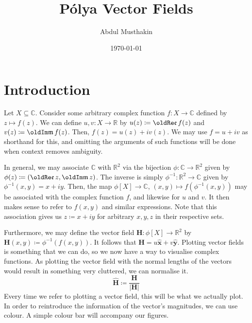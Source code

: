 \documentclass[a4paper]{article}
\title{P\'olya Vector Fields}
\author{Abdul Musthakin}
\date{\today}
\newcommand{\R}{\mathbb{R}}
\newcommand{\C}{\mathbb{C}}
\renewcommand{\Im}{\mathop{\oldIm\mathfrak{m}}}
\renewcommand{\Re}{\mathop{\oldRe\mathfrak{e}}}
\theoremstyle{definition}
\begin{document}
\maketitle

\section{Introduction}

Let $X \subseteq \C$.
Consider some arbitrary complex function $f \colon X \to \C$ defined by $z \mapsto f(z)$.
We can define $u,v \colon X \to \R$ by $u(z) \coloneq \Re f (z)$ and $v(z) \coloneq \Im f(z)$.
Then, $f(z) = u(z) + i v(z)$.
We may use $f = u + i v$ as shorthand for this, and omitting the arguments of such functions will be done when context removes ambiguity.

In general, we may associate $\mathbb{C}$ with $\R^2$ via the bijection $\phi \colon \C \to \R^2$ given by $\phi(z) \coloneq (\Re z, \Im z)$.
The inverse is simply $\phi^{-1} \colon \R^2 \to \C$ given by $\phi^{-1}(x,y) = x + iy$.
Then, the map $\phi[X] \to \C$, $(x,y) \mapsto f\left(\phi^{-1}(x,y)\right)$ may be associated with the complex function $f$, and likewise for $u$ and $v$.
It then makes sense to refer to $f(x,y)$ and similar expressions.
Note that this association gives us $z \coloneq x + iy$ for arbitrary $x,y,z$ in their respective sets.

Furthermore, we may define the vector field $\mathbf{H} \colon \phi[X] \to \R^2$ by $\mathbf{H}(x,y) \coloneq \phi^{-1} (f(x,y))$.
It follows that $\mathbf{H} = u\mathbf{\hat{x}} + v\mathbf{\hat{y}}$.
Plotting vector fields is something that we can do, so we now have a way to visualise complex functions.
As plotting the vector field with the normal lengths of the vectors would result in something very cluttered, we can normalise it.
\begin{equation*}
    \mathbf{\hat{H}} \coloneq \frac{\mathbf{H}}{\lvert \mathbf{H} \rvert}
\end{equation*}
Every time we refer to plotting a vector field, this will be what we actually plot.
In order to reintroduce the information of the vector's magnitudes, we can use colour.
A simple colour bar will accompany our figures.
\end{document}
